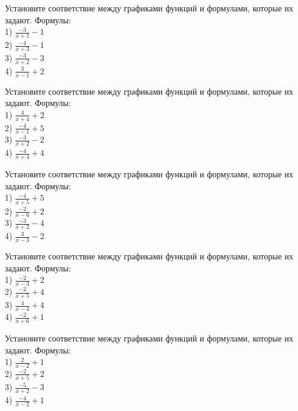 \documentclass[4apaper]{article}
\begin{document}
\begin{taskBN}{1}
Установите соответствие между графиками функций и формулами, которые их задают. Формулы: \\1) $\frac{-3}{x+1}-1$\\2) $\frac{-4}{x+3}-1$\\3) $\frac{-3}{x+2}-3$\\4) $\frac{3}{x-1}+2$
\end{taskBN}

\begin{taskBN}{2}
Установите соответствие между графиками функций и формулами, которые их задают. Формулы: \\1) $\frac{4}{x+4}+2$\\2) $\frac{-4}{x-1}+5$\\3) $\frac{-3}{x+2}-2$\\4) $\frac{-4}{x+4}+4$
\end{taskBN}

\begin{taskBN}{3}
Установите соответствие между графиками функций и формулами, которые их задают. Формулы: \\1) $\frac{-4}{x+5}+5$\\2) $\frac{-2}{x-6}+2$\\3) $\frac{-3}{x+2}-4$\\4) $\frac{3}{x-3}-2$
\end{taskBN}

\begin{taskBN}{4}
Установите соответствие между графиками функций и формулами, которые их задают. Формулы: \\1) $\frac{-2}{x-3}+2$\\2) $\frac{-2}{x+5}+4$\\3) $\frac{4}{x-4}+4$\\4) $\frac{-2}{x+6}+1$
\end{taskBN}

\begin{taskBN}{5}
Установите соответствие между графиками функций и формулами, которые их задают. Формулы: \\1) $\frac{2}{x-2}+1$\\2) $\frac{-2}{x+5}+2$\\3) $\frac{-5}{x+2}-3$\\4) $\frac{-4}{x-2}+1$
\end{taskBN}
\end{document}
